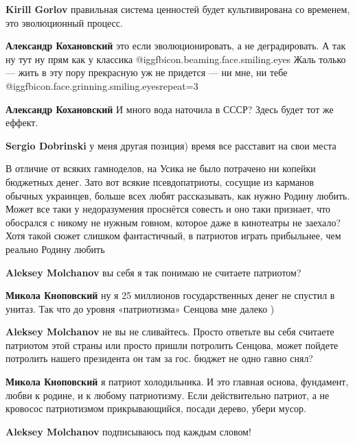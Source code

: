 \begin{itemize}
\begin{itemize}
\textbf{Kirill Gorlov} правильная система ценностей будет культивирована со временем, это эволюционный процесс.

\textbf{Александр Кохановский} это если эволюционировать, а не деградировать. А так ну тут ну прям как у классика @igg{fbicon.beaming.face.smiling.eyes} 
Жаль только — жить в эту пору прекрасную уж не придется — ни мне, ни тебе @igg{fbicon.face.grinning.smiling.eyes}{repeat=3} 

\textbf{Александр Кохановский} И много вода наточила в СССР? Здесь будет тот же еффект.

\textbf{Sergio Dobrinski} у меня другая позиция) время все расставит на свои места

\end{itemize} %


В отличие от всяких гамноделов, на Усика не было потрачено ни копейки бюджетных
денег. Зато вот всякие псевдопатриоты, сосущие из карманов обычных украинцев,
больше всех любят рассказывать, как нужно Родину любить. Может все таки у
недоразумения проснётся совесть и оно таки признает, что обосрался с никому не
нужным говном, которое даже в кинотеатры не заехало? Хотя такой сюжет слишком
фантастичный, в патриотов играть прибыльнее, чем реально Родину любить

\begin{itemize} %
\textbf{Aleksey Molchanov} вы себя я так понимаю не считаете патриотом?

\textbf{Микола Кноповский} ну я 25 миллионов государственных денег не спустил в унитаз. Так что до уровня «патриотизма» Сенцова мне далеко )

\textbf{Aleksey Molchanov} не вы не сливайтесь. Просто ответьте вы себя считаете патриотом этой страны или просто пришли потролить Сенцова, может пойдете потролить нашего президента он там за гос. бюджет не одно гавно снял?

\textbf{Микола Кноповский} я патриот холодильника. И это главная основа, фундамент, любви к родине, и к любому патриотизму. Если действительно патриот, а не кровосос патриотизмом прикрывающийся, посади дерево, убери мусор.

\textbf{Aleksey Molchanov} подписываюсь под каждым словом!


\end{itemize}
\end{itemize}
